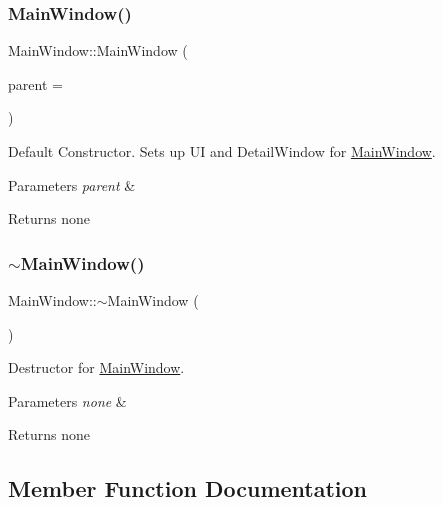 \subsubsection{\texorpdfstring{Main\+Window()}{MainWindow()}}
{\footnotesize\ttfamily Main\+Window\+::\+Main\+Window (\begin{DoxyParamCaption}\item[{Q\+Widget $\ast$}]{parent = {} }\end{DoxyParamCaption})\hspace{0.3cm}{\ttfamily [explicit]}}

Default Constructor. Sets up UI and Detail\+Window for \hyperlink{class_main_window}{Main\+Window}. 
\begin{DoxyParams}{Parameters}
{\em parent} & \\
\hline
\end{DoxyParams}
\begin{DoxyReturn}{Returns}
none 
\end{DoxyReturn}
\mbox{\label{class_main_window_ae98d00a93bc118200eeef9f9bba1dba7}} 
\subsubsection{\texorpdfstring{$\sim$\+Main\+Window()}{~MainWindow()}}
{\footnotesize\ttfamily Main\+Window\+::$\sim$\+Main\+Window (\begin{DoxyParamCaption}{ }\end{DoxyParamCaption})}

Destructor for \hyperlink{class_main_window}{Main\+Window}. 
\begin{DoxyParams}{Parameters}
{\em none} & \\
\hline
\end{DoxyParams}
\begin{DoxyReturn}{Returns}
none 
\end{DoxyReturn}


\subsection{Member Function Documentation}
\mbox{\label{class_main_window_a9be9fbd759eb5d1efe76f94d3e16fdc3}} 
